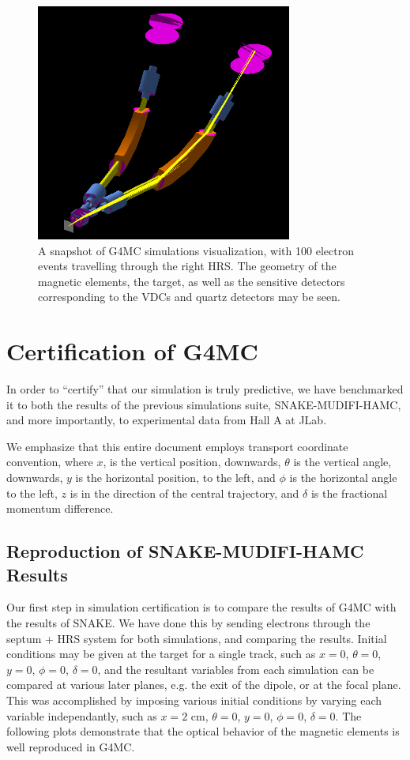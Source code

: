 \documentclass[11pt]{amsart}
\begin{document}
\FloatBarrier
\begin{figure}
\includegraphics[width=0.75\textwidth]{plots/traj.png}
\caption{A snapshot of G4MC simulations visualization, with 100 electron events travelling through the right HRS. The geometry of the magnetic elements, the target, as well as the sensitive detectors corresponding to the VDCs and quartz detectors may be seen.}
\end{figure}
\FloatBarrier

\newpage
\section{Certification of G4MC}

In order to ``certify'' that our simulation is truly predictive, we have benchmarked it to both the results of the previous simulations suite, SNAKE-MUDIFI-HAMC, and more importantly, to experimental data from Hall A at JLab.

We emphasize that this entire document employs transport coordinate convention, where $x$, is the vertical position, downwards, $\theta$ is the vertical angle, downwards, $y$ is the horizontal position, to the left, and $\phi$ is the horizontal angle to the left, $z$ is in the direction of the central trajectory, and $\delta$ is the fractional momentum difference.

\subsection{Reproduction of SNAKE-MUDIFI-HAMC Results}

Our first step in simulation certification is to compare the results of G4MC with the results of SNAKE. We have done this by sending electrons through the septum + HRS system for both simulations, and comparing the results. Initial conditions may be given at the target for a single track, such as $x=0$, $\theta=0$, $y=0$, $\phi=0$, $\delta=0$, and the resultant variables from each simulation can be compared at various later planes, e.g. the exit of the dipole, or at the focal plane. This was accomplished by imposing various initial conditions by varying each variable independantly, such as $x=2\text{ cm}$, $\theta=0$, $y=0$, $\phi=0$, $\delta=0$. The following plots demonstrate that the optical behavior of the magnetic elements is well reproduced in G4MC.
\end{document}

